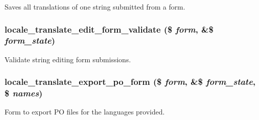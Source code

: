 Saves all translations of one string submitted from a form. \hypertarget{group__locale_ga93fc48be446148e648c9a1d0f630726e}{
\subsubsection[{locale\_\-translate\_\-edit\_\-form\_\-validate}]{\setlength{\rightskip}{0pt plus 5cm}locale\_\-translate\_\-edit\_\-form\_\-validate (\$ {\em form}, \/  \&\$ {\em form\_\-state})}}
\label{group__locale_ga93fc48be446148e648c9a1d0f630726e}
Validate string editing form submissions. \hypertarget{group__locale_ga5cac42d032877eb9c827b8ec0477a22e}{
\subsubsection[{locale\_\-translate\_\-export\_\-po\_\-form}]{\setlength{\rightskip}{0pt plus 5cm}locale\_\-translate\_\-export\_\-po\_\-form (\$ {\em form}, \/  \&\$ {\em form\_\-state}, \/  \$ {\em names})}}
\label{group__locale_ga5cac42d032877eb9c827b8ec0477a22e}
Form to export PO files for the languages provided.


